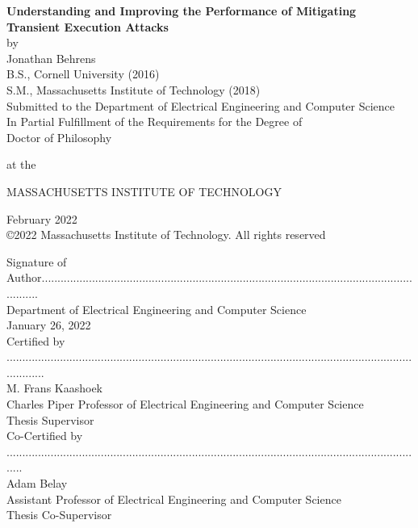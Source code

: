 \begin{titlepage}

    \centering
    \onehalfspacing
    {\large \bf Understanding and Improving the Performance of Mitigating Transient Execution Attacks} \\[1\baselineskip]
    by \\[0.25\baselineskip]
    {\large Jonathan Behrens} \\[1\baselineskip]

    B.S., Cornell University (2016) \\
    S.M., Massachusetts Institute of Technology (2018) \\[1\baselineskip]

    Submitted to the Department of Electrical Engineering and Computer Science \\
    In Partial Fulfillment of the Requirements for the Degree of\\[0.5\baselineskip]

    Doctor of Philosophy

    at the 

    MASSACHUSETTS INSTITUTE OF TECHNOLOGY

    February 2022 \\[0.5\baselineskip]

    \copyright 2022 Massachusetts Institute of Technology. All rights reserved \\[0.25in]

    \singlespacing
    \raggedleft
    \small

    Signature of Author................................................................................................................................ \\
    Department of Electrical Engineering and Computer Science \\
    January 26, 2022 \\[1\baselineskip]

    Certified by ............................................................................................................................................. \\
    M. Frans Kaashoek \\
    Charles Piper Professor of Electrical Engineering and Computer Science \\
    Thesis Supervisor \\[1\baselineskip]

    Co-Certified by ...................................................................................................................................... \\
    Adam Belay \\
    Assistant Professor of Electrical Engineering and Computer Science \\
    Thesis Co-Supervisor \\[1\baselineskip]


\end{titlepage}
